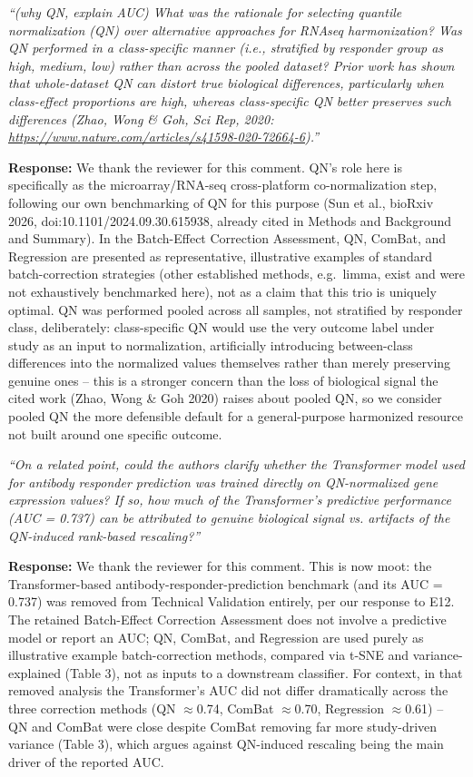 \documentclass[11pt]{article}
\newcommand{\origcomment}[1]{\textit{``#1''}}
\newcommand{\filledresponse}[1]{%
  \par\medskip\noindent\textbf{Response:} #1\par
  \vspace{0.4cm}%
  \par\noindent\hrulefill\par\bigskip
}
\begin{document}
\begin{commentlist}
\item[R2-4a.] \origcomment{(why QN, explain AUC) What was the rationale for selecting quantile
normalization (QN) over alternative approaches for RNAseq harmonization? Was QN performed in a
class-specific manner (i.e., stratified by responder group as high, medium, low) rather than
across the pooled dataset? Prior work has shown that whole-dataset QN can distort true biological
differences, particularly when class-effect proportions are high, whereas class-specific QN
better preserves such differences (Zhao, Wong \& Goh, Sci Rep, 2020:
\url{https://www.nature.com/articles/s41598-020-72664-6}).}
\filledresponse{We thank the reviewer for this comment. QN's role here is specifically as the
microarray/RNA-seq cross-platform co-normalization step, following our own benchmarking of QN for
this purpose (Sun et al., bioRxiv 2026, doi:10.1101/2024.09.30.615938, already cited in Methods and
Background and Summary). In the Batch-Effect Correction Assessment, QN, ComBat, and Regression are
presented as representative, illustrative examples of standard batch-correction strategies (other
established methods, e.g.\ limma, exist and were not exhaustively benchmarked here), not as a claim
that this trio is uniquely optimal. QN was performed pooled across all samples, not stratified by
responder class, deliberately: class-specific QN would use the very outcome label under study as
an input to normalization, artificially introducing between-class differences into the normalized
values themselves rather than merely preserving genuine ones -- this is a stronger concern than the
loss of biological signal the cited work (Zhao, Wong \& Goh 2020) raises about pooled QN, so we
consider pooled QN the more defensible default for a general-purpose harmonized resource not built
around one specific outcome.}

\item[R2-4b.] \origcomment{On a related point, could the authors clarify whether the Transformer
model used for antibody responder prediction was trained directly on QN-normalized gene
expression values? If so, how much of the Transformer's predictive performance (AUC = 0.737) can
be attributed to genuine biological signal vs. artifacts of the QN-induced rank-based rescaling?}
\filledresponse{We thank the reviewer for this comment. This is now moot: the Transformer-based
antibody-responder-prediction benchmark (and its AUC = 0.737) was removed from Technical Validation
entirely, per our response to E12. The retained Batch-Effect Correction Assessment does not involve
a predictive model or report an AUC; QN, ComBat, and Regression are used purely as illustrative
example batch-correction methods, compared via t-SNE and variance-explained (Table 3), not as
inputs to a downstream classifier. For context, in that removed analysis the Transformer's AUC did
not differ dramatically across the three correction methods (QN $\approx$0.74, ComBat
$\approx$0.70, Regression $\approx$0.61) -- QN and ComBat were close despite ComBat removing far
more study-driven variance (Table 3), which argues against QN-induced rescaling being the main
driver of the reported AUC.}


\end{commentlist}
\end{document}
